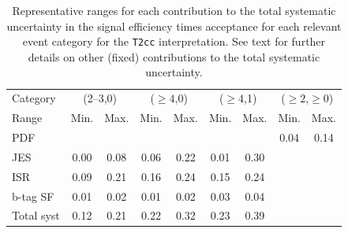 \begin{table}[h!]
  \caption{Representative ranges for each contribution to the total
    systematic uncertainty in the signal efficiency times acceptance
    for each relevant event category for the \texttt{T2cc}
    interpretation. See text for further details on other
    (fixed) contributions to the total systematic uncertainty. 
    \label{tab:sms-syst-t2cc}
  }   
  \centering
  \begin{tabular}{ lcccccccc }
    \hline
    \hline
    Category   & \multicolumn{2}{c}{(2--3,0)} & \multicolumn{2}{c}{($\geq 4$,0)} & \multicolumn{2}{c}{($\geq 4$,1)} & \multicolumn{2}{c}{($\geq 2$,$\geq 0$)} \\
    Range      & Min.                         & Max.                             & Min.                             & Max. & Min. & Max. & Min. & Max.        \\
    \hline
    PDF        &                              &                                  &                                  &      &      &      & 0.04 & 0.14        \\
    JES        & 0.00                         & 0.08                             & 0.06                             & 0.22 & 0.01 & 0.30 &      &             \\
    ISR        & 0.09                         & 0.21                             & 0.16                             & 0.24 & 0.15 & 0.24 &      &             \\
    b-tag SF   & 0.01                         & 0.02                             & 0.01                             & 0.02 & 0.03 & 0.04 &      &             \\
    \hline
    Total syst & 0.12                         & 0.21                             & 0.22                             & 0.32 & 0.23 & 0.39 &      &             \\
    \hline
    \hline
  \end{tabular}
\end{table}

